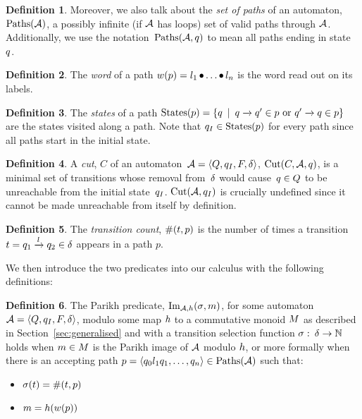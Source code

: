 \documentclass[acmsmall,review,anonymous]{acmart}\settopmatter{printfolios=true,printccs=false,printacmref=true}
\theoremstyle{definition}
\newtheorem{definition}{Definition}[section]
\begin{document}
\begin{definition}
  Moreover, we also talk about the \textit{set of paths} of an automaton,
  $\operatorname{Paths}(\mathcal{A})$, a possibly infinite (if $\mathcal{A}$ has loops) set of
  valid paths through $\mathcal{A}$. Additionally, we use the
  notation~$\operatorname{Paths}(\mathcal{A}, q)$ to mean all paths ending in
  state~$q$.
\end{definition}

\begin{definition}
  The \textit{word} of a path $w(p) = l_1 \operatorname{\bullet} \ldots \operatorname{\bullet} l_n$ is
  the word read out on its labels.
\end{definition}

\begin{definition}
  The \textit{states} of a path $\operatorname{States}(p) = \left\{q \:\mid\:
  q \xrightarrow{} q' \in p \text{ or }
  q' \xrightarrow{} q \in p\right\}$ are the states visited along a
  path. Note that $q_I \in \operatorname{States}(p)$ for every path since all
  paths start in the initial state.
\end{definition}

\begin{definition}
  A \textit{cut}, $C$ of an automaton~$\mathcal{A} = \left\langle Q, q_I, F, \delta\right\rangle$,
  $\operatorname{Cut}(C, \mathcal{A}, q)$, is a minimal set of transitions whose
  removal from~$\delta$ would cause~$q \in Q$ to be unreachable
  from the initial state~$q_I$. $\operatorname{Cut}(\mathcal{A},
  q_I)$ is crucially undefined since it cannot be made unreachable
  from itself by definition.
\end{definition}

\begin{definition}
 The \textit{transition count}, $\operatorname{\#}(t, p)$ is the
 number of times a transition $t =
 q_1 \xrightarrow{l} q_2 \in \delta$ appears in a path
 $p$.
\end{definition}

We then introduce the two predicates into our calculus with the following
definitions:

\begin{definition}
  The Parikh predicate, $\operatorname{Im}_{\mathcal{A}, h}(\operatorname{\sigma}, m)$, for some automaton
  $\mathcal{A} = \left\langle Q, q_I, F, \delta\right\rangle$, modulo some map $h$ to a commutative monoid
  $M$ as described in Section~\ref{sec:generalised} and with a transition
  selection function $\operatorname{\sigma}:\: \delta \to \mathbb{N}$ holds when
  $m \in M$ is the Parikh image of $\mathcal{A}$ modulo
  $h$, or more formally when there is an accepting path $p =
  \left\langle q_0 l_1 q_1 , \ldots , q_n\right\rangle \in \operatorname{Paths}(\mathcal{A})$ such that:
  \begin{itemize}
    \item $\operatorname{\sigma}(t) = \operatorname{\#}(t, p)$
    \item $m = h(w(p))$
  \end{itemize}
\end{definition}
\end{document}
